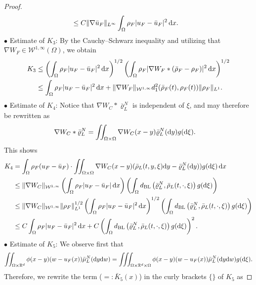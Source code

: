 \documentclass[10pt, reqno]{amsart}
\theoremstyle{definition}
\theoremstyle{remark}
\numberwithin{equation}{section}
\newcommand{\dx}{\textnormal{d}x}
\newcommand{\dy}{\textnormal{d}y}
\newcommand{\dw}{\textnormal{d}w}
\newcommand{\dxi}{\textnormal{d}\xi}
\newcommand{\calW}{\mathcal W}
\newcommand{\R}{\mathbb{R}}
\begin{document}
\begin{proof}
\begin{align*}
        &\le C\|\nabla \bar u_F\|_{L^\infty} \int_{\Omega} \rho_F |u_F - \bar u_F|^2\,\dx.
    \end{align*}
    $\bullet$ Estimate of $K_3$: By the Cauchy--Schwarz inequality and utilizing that $\nabla W_F\in \calW^{1,\infty}(\Omega)$, we obtain
    \begin{align*}
        K_3 &\le \left(\int_{\Omega} \rho_F |u_F - \bar u_F|^2\,\dx \right)^{1/2} \left(\int_{\Omega} \rho_F |\nabla W_F * (\bar \rho_F - \rho_F)|^2\,\dx \right)^{1/2} \\
        &\le \int_{\Omega} \rho_F|u_F - \bar u_F|^2\,\dx + \|\nabla W_F\|_{\calW^{1,\infty}} d_{1}^2(\bar \rho_F(t), \rho_F(t)) \|\rho_F\|_{L^1}.
    \end{align*}
    $\bullet$ Estimate of $K_4$: Notice that $\nabla W_C * \bar\varrho_L^N$ is independent of $\xi$, and may therefore be rewritten as
    \begin{align*}
        \nabla W_C *  \bar\varrho_L^N &= \iint_{\Omega \times \Omega} \nabla W_C(x-y) \bar\varrho_L^N(\dy) g(\dxi).
    \end{align*}
    This shows
    \begin{align*}
        K_4 &= \int_{\Omega} \rho_F (u_F - \bar u_F)\cdot  \iint_{\Omega \times \Omega} \nabla W_C(x-y) (\bar \rho_L(t,y,\xi)\dy - \bar\varrho_L^N(\dy)) g(\dxi)\,\dx \\
        &\le \|\nabla W_C\|_{\calW^{1,\infty}}\left( \int_{\Omega} \rho_F |u_F - \bar u_F| \,\dx \right) \left( \int_{\Omega} d_{\rm BL}\left(\bar\varrho_L^N , \bar \rho_L(t,\cdot,\xi) \right) g(\dxi) \right) \\
        &\le \|\nabla W_C\|_{\calW^{1,\infty}} \|\rho_F\|_{L^1}^{1/2}\left(\int_{\Omega} \rho_F |u_F - \bar u_F|^2 \,\dx \right)^{1/2}\left( \int_{\Omega} d_{\rm BL}\left(\bar\varrho_L^N, \bar \rho_L(t,\cdot,\xi)\right) g(\dxi) \right) \\
        &\le C \int_{\Omega}\rho_F|u_F - \bar u_F|^2\,\dx + C \left( \int_{\Omega} d_{\rm BL}\left(\bar\varrho_L^N, \bar \rho_L(t,\cdot,\xi)\right) g(\dxi) \right)^2.
    \end{align*}
    $\bullet$ Estimate of $K_5$: We observe first that
    \begin{align*}
      \iint_{\Omega\times\R^d} \phi(x-y) (w- u_F(x)) \bar\mu_L^N(\dy\dw)  =       \iiint_{\Omega\times\R^d\times\Omega} \phi(x-y) (w- u_F(x)) \bar\mu_L^N(\dy\dw)g(\dxi).
    \end{align*}
    Therefore, we rewrite the term ($=: \bar K_5(x)$) in the curly brackets $\{\}$ of $K_5$ as

\end{proof}
\end{document}
